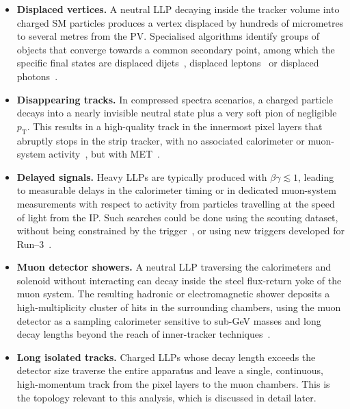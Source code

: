 \begin{itemize}
    \item \textbf{Displaced vertices.} A neutral LLP decaying inside the tracker volume into charged SM particles produces a vertex displaced by hundreds of micrometres to several metres from the PV. Specialised algorithms identify groups of objects that converge towards a common secondary point, among which the specific final states are displaced dijets~\cite{PhysRevD.109.112005, Collaboration_2025}, displaced leptons~\cite{CMS:2021kdm, 2024baababazed} or displaced photons~\cite{PhysRevD.100.112003}.
    \item \textbf{Disappearing tracks.} In compressed spectra scenarios, a charged particle decays into a nearly invisible neutral state plus a very soft pion of negligible $p_{\mathrm{T}}$. This results in a high-quality track in the innermost pixel layers that abruptly stops in the strip tracker, with no associated calorimeter or muon-system activity~\cite{2020135502}, but with MET~\cite{PhysRevD.109.112005}.
    \item \textbf{Delayed signals.} Heavy LLPs are typically produced with $\beta\gamma\lesssim 1$, leading to measurable delays in the calorimeter timing or in dedicated muon-system measurements with respect to activity from particles travelling at the speed of light from the IP. Such searches could be done using the scouting dataset, without being constrained by the trigger~\cite{cmscollaboration2026searchheavylonglivedcharged}, or using new triggers developed for Run--3~\cite{cmscollaboration2026strategyperformancecmslonglived}.
    \item \textbf{Muon detector showers.} A neutral LLP traversing the calorimeters and solenoid without interacting can decay inside the steel flux-return yoke of the muon system. The resulting hadronic or electromagnetic shower deposits a high-multiplicity cluster of hits in the surrounding chambers, using the muon detector as a sampling calorimeter sensitive to sub-GeV masses and long decay lengths beyond the reach of inner-tracker techniques~\cite{PhysRevD.110.032007, PhysRevD.110.012004}.
    \item \textbf{Long isolated tracks.} Charged LLPs whose decay length exceeds the detector size traverse the entire apparatus and leave a single, continuous, high-momentum track from the pixel layers to the muon chambers. This is the topology relevant to this analysis, which is discussed in detail later.
\end{itemize}

